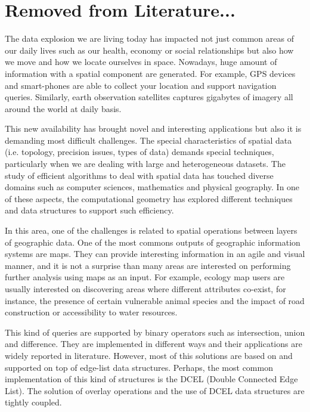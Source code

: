 \section{Removed from Literature...}
The data explosion we are living today has impacted not just common areas of our daily lives such as our health, economy or social relationships but also how we move and how we locate ourselves in space.  Nowadays, huge amount of information with a spatial component are generated.  For example, GPS devices and smart-phones are able to collect your location and support navigation queries.  Similarly, earth observation satellites captures gigabytes of imagery all around the world at daily basis.

This new availability has brought novel and interesting applications but also it is demanding most difficult challenges.  The special characteristics of spatial data (i.e. topology, precision issues, types of data) demands special techniques, particularly when we are dealing with large and heterogeneous datasets.  The study of efficient algorithms to deal with spatial data has touched diverse domains such as computer sciences, mathematics and physical geography.  In one of these aspects, the computational geometry has explored different techniques and data structures to support such efficiency.

In this area, one of the challenges is related to spatial operations between layers of geographic data.  One of the most commons outputs of geographic information systems are maps.  They can provide interesting information in an agile and visual manner, and it is not a surprise than many areas are interested on performing further analysis using maps as an input.  For example, ecology map users are usually interested on discovering areas where different attributes co-exist, for instance, the presence of certain vulnerable animal species and the impact of road construction or accessibility to water resources.  

This kind of queries are supported by binary operators such as intersection, union and difference.  They are implemented in different ways and their applications are widely reported in literature.  However, most of this solutions are based on and supported on top of edge-list data structures.  Perhaps, the most common implementation of this kind of structures is the DCEL (Double Connected Edge List).  The solution of overlay operations and the use of DCEL data structures are tightly coupled.


